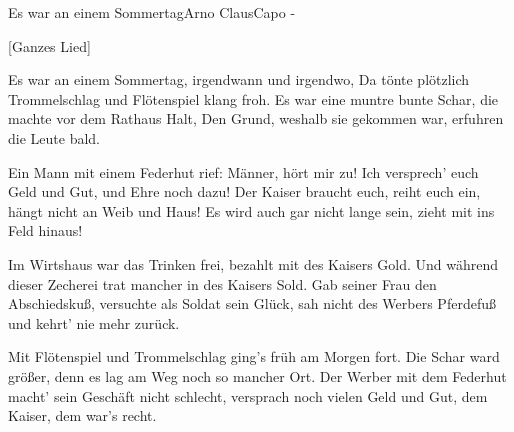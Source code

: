 \begin{song}{Es war an einem Sommertag}{Arno Claus}{Capo -}


[Ganzes Lied]
 

Es war an einem Sommertag, irgendwann und irgendwo,
Da tönte plötzlich Trommelschlag und Flötenspiel klang froh.
Es war eine muntre bunte Schar, die machte vor dem Rathaus Halt,
Den Grund, weshalb sie gekommen war, erfuhren die Leute bald.

 

Ein Mann mit einem Federhut rief: Männer, hört mir zu!
Ich versprech' euch Geld und Gut, und Ehre noch dazu!
Der Kaiser braucht euch, reiht euch ein, hängt nicht an Weib und Haus!
Es wird auch gar nicht lange sein, zieht mit ins Feld hinaus!

 

Im Wirtshaus war das Trinken frei, bezahlt mit des Kaisers Gold.
Und während dieser Zecherei trat mancher in des Kaisers Sold.
Gab seiner Frau den Abschiedskuß, versuchte als Soldat sein Glück,
sah nicht des Werbers Pferdefuß und kehrt' nie mehr zurück.

 

Mit Flötenspiel und Trommelschlag ging's früh am Morgen fort.
Die Schar ward größer, denn es lag am Weg noch so mancher Ort.
\newpage
{}
Der Werber mit dem Federhut macht' sein Geschäft nicht schlecht,
versprach noch vielen Geld und Gut, dem Kaiser, dem war's recht.


\end{song}
